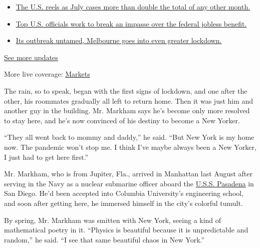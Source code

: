 \begin{itemize}
\tightlist
\item
  \href{https://www.nytimes.com/2020/08/01/world/coronavirus-covid-19.html?action=click\&pgtype=Article\&state=default\&region=MAIN_CONTENT_1\&context=storylines_live_updates\#link-34047410}{The
  U.S. reels as July cases more than double the total of any other
  month.}
\item
  \href{https://www.nytimes.com/2020/08/01/world/coronavirus-covid-19.html?action=click\&pgtype=Article\&state=default\&region=MAIN_CONTENT_1\&context=storylines_live_updates\#link-780ec966}{Top
  U.S. officials work to break an impasse over the federal jobless
  benefit.}
\item
  \href{https://www.nytimes.com/2020/08/01/world/coronavirus-covid-19.html?action=click\&pgtype=Article\&state=default\&region=MAIN_CONTENT_1\&context=storylines_live_updates\#link-2bc8948}{Its
  outbreak untamed, Melbourne goes into even greater lockdown.}
\end{itemize}

\href{https://www.nytimes.com/2020/08/01/world/coronavirus-covid-19.html?action=click\&pgtype=Article\&state=default\&region=MAIN_CONTENT_1\&context=storylines_live_updates}{See
more updates}

More live coverage:
\href{https://www.nytimes.com/live/2020/07/31/business/stock-market-today-coronavirus?action=click\&pgtype=Article\&state=default\&region=MAIN_CONTENT_1\&context=storylines_live_updates}{Markets}

The rain, so to speak, began with the first signs of lockdown, and one
after the other, his roommates gradually all left to return home. Then
it was just him and another guy in the building. Mr. Markham says he's
become only more resolved to stay here, and he's now convinced of his
destiny to become a New Yorker.

``They all went back to mommy and daddy,'' he said. ``But New York is my
home now. The pandemic won't stop me. I think I've maybe always been a
New Yorker, I just had to get here first.''

Mr. Markham, who is from Jupiter, Fla., arrived in Manhattan last August
after serving in the Navy as a nuclear submarine officer aboard the
\href{https://www.csp.navy.mil/pasadena/About/}{U.S.S. Pasadena} in San
Diego. He'd been accepted into Columbia University's engineering school,
and soon after getting here, he immersed himself in the city's colorful
tumult.

By spring, Mr. Markham was smitten with New York, seeing a kind of
mathematical poetry in it. ``Physics is beautiful because it is
unpredictable and random,'' he said. ``I see that same beautiful chaos
in New York.''

